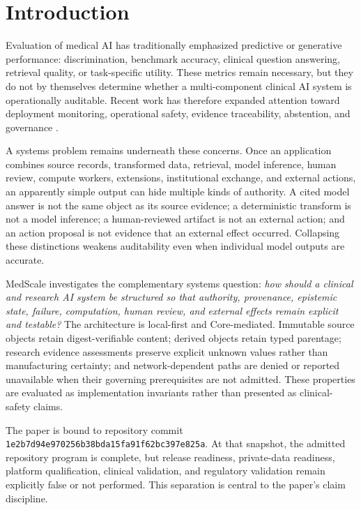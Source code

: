 \section{Introduction}

Evaluation of medical AI has traditionally emphasized predictive or generative performance: discrimination, benchmark accuracy, clinical question answering, retrieval quality, or task-specific utility. These metrics remain necessary, but they do not by themselves determine whether a multi-component clinical AI system is operationally auditable. Recent work has therefore expanded attention toward deployment monitoring, operational safety, evidence traceability, abstention, and governance \citep{Noori.2025,Kim.2026,Andersen.2024,Cao.2026}.

A systems problem remains underneath these concerns. Once an application combines source records, transformed data, retrieval, model inference, human review, compute workers, extensions, institutional exchange, and external actions, an apparently simple output can hide multiple kinds of authority. A cited model answer is not the same object as its source evidence; a deterministic transform is not a model inference; a human-reviewed artifact is not an external action; and an action proposal is not evidence that an external effect occurred. Collapsing these distinctions weakens auditability even when individual model outputs are accurate.

MedScale investigates the complementary systems question: \emph{how should a clinical and research AI system be structured so that authority, provenance, epistemic state, failure, computation, human review, and external effects remain explicit and testable?} The architecture is local-first and Core-mediated. Immutable source objects retain digest-verifiable content; derived objects retain typed parentage; research evidence assessments preserve explicit unknown values rather than manufacturing certainty; and network-dependent paths are denied or reported unavailable when their governing prerequisites are not admitted. These properties are evaluated as implementation invariants rather than presented as clinical-safety claims.

The paper is bound to repository commit \texttt{1e2b7d94e970256b38bda15fa91f62bc397e825a}. At that snapshot, the admitted repository program is complete, but release readiness, private-data readiness, platform qualification, clinical validation, and regulatory validation remain explicitly false or not performed. This separation is central to the paper's claim discipline.

